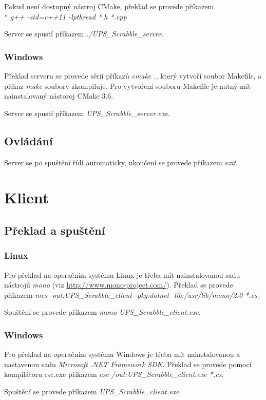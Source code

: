 Pokud není dostupný nástroj CMake, překlad se provede příkazem \\* \emph{g++ -std=c++11 -lpthread *.h *.cpp}

Server se spustí příkazem \emph{./UPS\_Scrabble\_server}.

\subsubsection{Windows}
Překlad serveru se provede sérií příkazů \emph{cmake .}, který vytvoří soubor Makefile, a příkaz \emph{make} soubory zkompiluje. Pro vytvoření souboru Makefile je nutný mít nainstalovaný nástoroj CMake 3.6.

Server se spustí příkazem \emph{UPS\_Scrabble\_server.exe}.

\subsection{Ovládání}
Server se po spuštění řídí automaticky, ukončení se provede příkazem \emph{exit}.


\section{Klient}
\subsection{Překlad a spuštění}
\subsubsection{Linux}
Pro překlad na operačním systému Linux je třeba mít nainstalovanou sadu nástrojů \emph{mono} (viz \url{http://www.mono-project.com/}).
Překlad se provede příkazem \emph{mcs -out:UPS\_Scrabble\_client -pkg:dotnet -lib:/usr/lib/mono/2.0 *.cs}.

Spuštění se provede příkazem \emph{mono UPS\_Scrabble\_client.exe}.

\subsubsection{Windows}
Pro překlad na operačním systému Windows je třeba mít nainstalovanou a nastavenou sadu \emph{Microsoft .NET Framework SDK}.
Překlad se provede pomocí kompilátoru csc.exe příkazem \emph{csc /out:UPS\_Scrabble\_client.exe *.cs}.

Spuštění se provede příkazem \emph{UPS\_Scrabble\_client.exe}.

